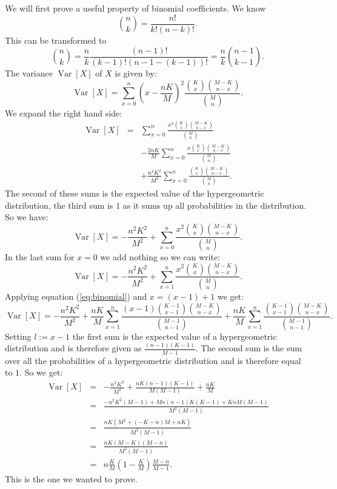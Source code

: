 \documentclass[12pt]{article}
\begin{document}
We will first prove a useful property of binomial coefficients. We know
$${n\choose k}=\frac{n!}{k!(n-k)!}.$$
This can be transformed to
\begin{equation}\label{eq:binomial}
{n\choose k}=\frac{n}{k}\frac{(n-1)!}{(k-1)!(n-1-(k-1))!}=\frac{n}{k}{n-1\choose k-1}.
\end{equation}
The variance $\operatorname{Var}[X]$ of $X$ is given by:
$$\operatorname{Var}[X]=\sum_{x=0}^n\left(x-\frac{nK}{M}\right)^2\frac{{K\choose x}{M-K\choose n-x}}{{M\choose n}}.$$
We expand the right hand side:
\begin{eqnarray*}
\operatorname{Var}[X] & = & \sum_{x=0}^n\frac{x^2{K\choose x}{M-K\choose n-x}}{{M\choose n}}\\
&& -\frac{2nK}{M}\sum_{x=0}^n\frac{x{K\choose x}{M-K\choose n-x}}{{M\choose n}}\\
&& +\frac{n^2K^2}{M^2}\sum_{x=0}^n\frac{{K\choose x}{M-K\choose n-x}}{{M\choose n}}.
\end{eqnarray*}
The second of these sums is the expected value of the hypergeometric distribution, the third sum is $1$ as it sums up all probabilities in the distribution. So we have:
$$\operatorname{Var}[X]=-\frac{n^2K^2}{M^2}+\sum_{x=0}^n\frac{x^2{K\choose x}{M-K\choose n-x}}{{M\choose n}}.$$
In the last sum for $x=0$ we add nothing so we can write:
$$\operatorname{Var}[X]=-\frac{n^2K^2}{M^2}+\sum_{x=1}^n\frac{x^2{K\choose x}{M-K\choose n-x}}{{M\choose n}}.$$
Applying equation (\ref{eq:binomial}) and $x=(x-1)+1$ we get:
$$\operatorname{Var}[X]=-\frac{n^2K^2}{M^2}+\frac{nK}{M}\sum_{x=1}^n\frac{(x-1){K-1\choose x-1}{M-K\choose n-x}}{{M-1\choose n-1}}+\frac{nK}{M} \sum_{x=1}^n\frac{{K-1\choose x-1}{M-K\choose n-x}}{{M-1\choose n-1}}.$$
Setting $l:=x-1$ the first sum is the expected value of a hypergeometric distribution and is therefore given as $\frac{(n-1)(K-1)}{M-1}$. The second sum is the sum over all the probabilities of a hypergeometric distribution and is therefore equal to $1$. So we get:
\begin{eqnarray*}
\operatorname{Var}[X]&=&-\frac{n^2K^2}{M^2}+\frac{nK(n-1)(K-1)}{M(M-1)}+\frac{nK}{M}\\
&=&\frac{-n^2K^2(M-1)+Mn(n-1)K(K-1)+KnM(M-1)}{M^2(M-1)}\\
&=&\frac{nK(M^2+(-K-n)M+nK)}{M^2(M-1)}\\
&=&\frac{nK(M-K)(M-n)}{M^2(M-1)}\\
&=&n\frac{K}{M}\left(1-\frac{K}{M}\right)\frac{M-n}{M-1}.
\end{eqnarray*}
This  is the one we wanted to prove.
\end{document}
